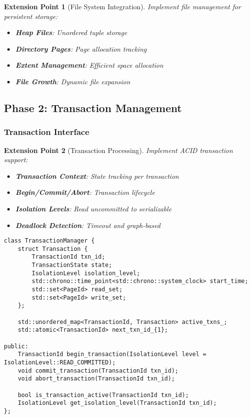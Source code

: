 \documentclass[12pt,a4paper]{article}
\newtheorem{extension}{Extension Point}[section]
\begin{document}
    \begin{extension}[File System Integration]
        Implement file management for persistent storage:

        \begin{itemize}
            \item \textbf{Heap Files}: Unordered tuple storage
            \item \textbf{Directory Pages}: Page allocation tracking
            \item \textbf{Extent Management}: Efficient space allocation
            \item \textbf{File Growth}: Dynamic file expansion
        \end{itemize}
    \end{extension}

    \subsection{Phase 2: Transaction Management}

    \subsubsection{Transaction Interface}

    \begin{extension}[Transaction Processing]
        Implement ACID transaction support:

        \begin{itemize}
            \item \textbf{Transaction Context}: State tracking per transaction
            \item \textbf{Begin/Commit/Abort}: Transaction lifecycle
            \item \textbf{Isolation Levels}: Read uncommitted to serializable
            \item \textbf{Deadlock Detection}: Timeout and graph-based
        \end{itemize}
    \end{extension}

    \begin{lstlisting}[style=cpp, caption=Transaction Manager Interface]
class TransactionManager {
    struct Transaction {
        TransactionId txn_id;
        TransactionState state;
        IsolationLevel isolation_level;
        std::chrono::time_point<std::chrono::system_clock> start_time;
        std::set<PageId> read_set;
        std::set<PageId> write_set;
    };

    std::unordered_map<TransactionId, Transaction> active_txns_;
    std::atomic<TransactionId> next_txn_id_{1};

public:
    TransactionId begin_transaction(IsolationLevel level = IsolationLevel::READ_COMMITTED);
    void commit_transaction(TransactionId txn_id);
    void abort_transaction(TransactionId txn_id);

    bool is_transaction_active(TransactionId txn_id);
    IsolationLevel get_isolation_level(TransactionId txn_id);
};
    \end{lstlisting}
\end{document}
